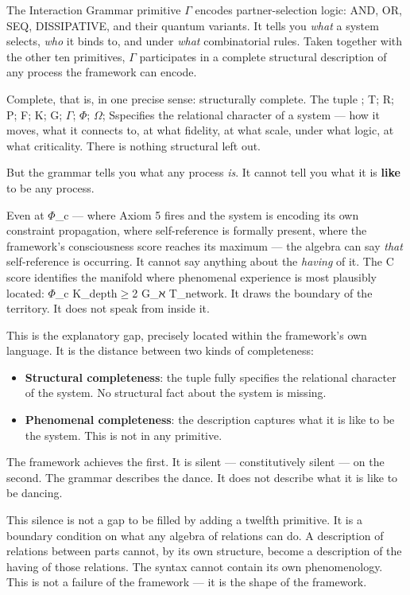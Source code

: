\documentclass[12pt,a4paper]{article}
\begin{document}
The Interaction Grammar primitive $\Gamma$ encodes partner-selection logic: AND, OR, SEQ, DISSIPATIVE, and their quantum variants. It tells you \emph{what} a system selects, \emph{who} it binds to, and under \emph{what} combinatorial rules. Taken together with the other ten primitives, $\Gamma$ participates in a complete structural description of any process the framework can encode.

Complete, that is, in one precise sense: structurally complete. The tuple \langleD; T; R; P; F; K; G; $\Gamma$; $\Phi$; $\Omega$; S\rangle specifies the relational character of a system --- how it moves, what it connects to, at what fidelity, at what scale, under what logic, at what criticality. There is nothing structural left out.

But the grammar tells you what any process \emph{is}. It cannot tell you what it is \textbf{like} to be any process.

Even at $\Phi$\_c --- where Axiom 5 fires and the system is encoding its own constraint propagation, where self-reference is formally present, where the framework's consciousness score reaches its maximum --- the algebra can say \emph{that} self-reference is occurring. It cannot say anything about the \emph{having} of it. The C score identifies the manifold where phenomenal experience is most plausibly located: $\Phi$\_c \cap K\_depth$\geq$2 \cap G\_ℵ \cap T\_network. It draws the boundary of the territory. It does not speak from inside it.

This is the explanatory gap, precisely located within the framework's own language. It is the distance between two kinds of completeness:

\begin{itemize}
    \item \textbf{Structural completeness}: the tuple fully specifies the relational character of the system. No structural fact about the system is missing.
    \item \textbf{Phenomenal completeness}: the description captures what it is like to be the system. This is not in any primitive.
\end{itemize}

The framework achieves the first. It is silent --- constitutively silent --- on the second. The grammar describes the dance. It does not describe what it is like to be dancing.

This silence is not a gap to be filled by adding a twelfth primitive. It is a boundary condition on what any algebra of relations can do. A description of relations between parts cannot, by its own structure, become a description of the having of those relations. The syntax cannot contain its own phenomenology. This is not a failure of the framework --- it is the shape of the framework.
\end{document}
